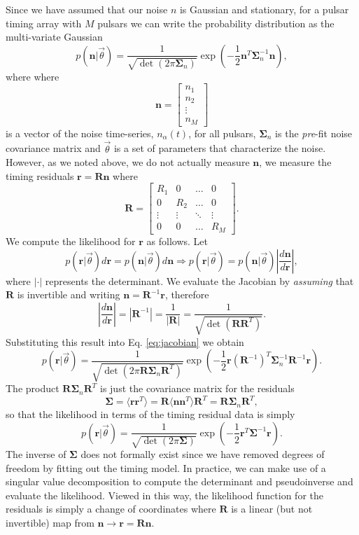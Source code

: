 \documentclass[iop]{emulateapj}
\newcommand{\be}{\begin{equation}}
\newcommand{\ee}{\end{equation}}
\newcommand{\lp}{\left(}
\newcommand{\rp}{\right)}
\newcommand{\bb}{\begin{bmatrix}}
\newcommand{\eb}{\end{bmatrix}}
\begin{document}
Since we have assumed that our noise $n$ is Gaussian and stationary, for a pulsar timing array with $M$ pulsars we can write the probability distribution as the multi-variate Gaussian
\be
\label{eq:likey}
p(\mathbf{n}|\vec\theta)=\frac{1}{\sqrt{\det(2 \pi \boldsymbol{\Sigma}_{n})}}\exp\lp-\frac{1}{2}\mathbf{n}^T\boldsymbol{\Sigma}_{n}^{-1}\mathbf{n}\rp,
\ee
where 
where
\be
\mathbf{n}=\bb {n}_{1} \\ {n}_{2}\\ \vdots \\ {n}_{M} \eb
\ee 
is a vector of the noise time-series, $n_{\alpha}(t)$, for all pulsars,
$\boldsymbol{\Sigma}_{n}$ is the \emph{pre}-fit noise covariance matrix and  $\vec\theta$ is a set of parameters that characterize the noise. However, as we noted above, we do not actually measure $\mathbf{n}$, we measure the timing residuals $\mathbf{r}=\mathbf{R}\mathbf{n}$ where 
\be
\label{eq:rmat}
\mathbf{R}=\bb  R_{1} & 0 & \hdots & 0\\ 
0 & R_{2} & \hdots & 0\\
\vdots & \vdots & \ddots & \vdots\\
0 & 0 & \hdots & R_{M}\eb.
\ee
 We compute the likelihood for $\mathbf{r}$ as follows. Let
\be
\label{eq:jacobian}
p(\mathbf{r}|\vec\theta)d\mathbf{r}=p(\mathbf{n}|\vec\theta)d\mathbf{n}\Rightarrow p(\mathbf{r}|\vec\theta)=p(\mathbf{n}|\vec\theta)\left|\frac{d\mathbf{n}}{d\mathbf{r}}\right|,
\ee
where $|\cdot|$ represents the determinant. We evaluate the Jacobian by \emph{assuming} that $\mathbf{R}$ is invertible and writing $\mathbf{n}=\mathbf{R}^{-1}\mathbf{r}$, therefore
\be
\left|\frac{d\mathbf{n}}{d\mathbf{r}}\right|=\left|\mathbf{R}^{-1}\right|=\frac{1}{\left|\mathbf{R}\right|}=\frac{1}{\sqrt{\det(\mathbf{R}\mathbf{R}^T)}}.
\ee
Substituting this result into Eq. \ref{eq:jacobian} we obtain
\be
p(\mathbf{r}|\vec\theta)=\frac{1}{\sqrt{\det(2\pi \mathbf{R}\boldsymbol{\Sigma}_{n}\mathbf{R}^T)}}\exp\lp-\frac{1}{2}\mathbf{r}(\mathbf{R}^{-1})^T\boldsymbol{\Sigma}_{n}^{-1} \mathbf{R}^{-1}\mathbf{r}\rp.
\ee
The product $\mathbf{R}\boldsymbol{\Sigma}_{n}\mathbf{R}^T$ is just the covariance matrix for the residuals
\be
\boldsymbol{\Sigma} = \langle \mathbf{r} \mathbf{r}^T  \rangle = \mathbf{R}\langle \mathbf{n} \mathbf{n}^T  \rangle \mathbf{R}^T= \mathbf{R}\boldsymbol{\Sigma}_{n}\mathbf{R}^{T},
\ee
so that the likelihood in terms of the timing residual data is simply
\be
\label{eq:liker}
p(\mathbf{r}|\vec\theta)=\frac{1}{\sqrt{\det(2 \pi \boldsymbol{\Sigma})}}\exp\lp-\frac{1}{2}\mathbf{r}^T\boldsymbol{\Sigma}^{-1}\mathbf{r}\rp.
\ee
The inverse of $\boldsymbol{\Sigma}$ does not formally exist since we have removed degrees of freedom by fitting out the timing model. In practice, we can make use of a singular value decomposition to compute the determinant and pseudoinverse and evaluate the likelihood. Viewed in this way, the likelihood function for the residuals is simply a change of coordinates  where $\mathbf{R}$ is a linear (but not invertible) map from $\mathbf{n}\rightarrow \mathbf{r}=\mathbf{R}\mathbf{n}$. 
\end{document}
